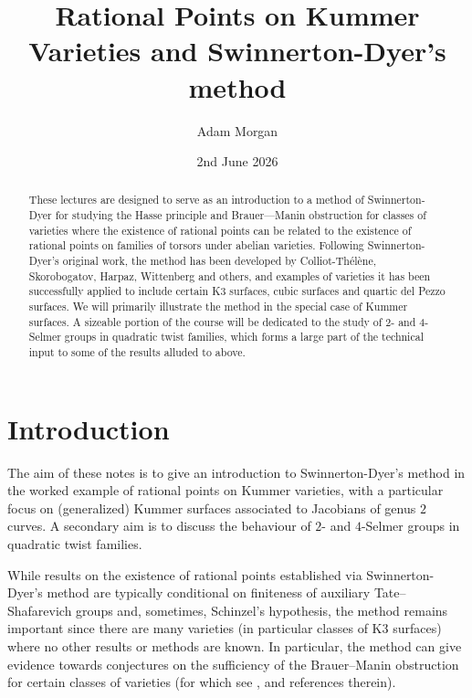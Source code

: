 \documentclass[10pt]{amsart}
\numberwithin{equation}{section}
\theoremstyle{remark}
\theoremstyle{definition}
\theoremstyle{definition}
\theoremstyle{definition}
\theoremstyle{definition}
\theoremstyle{definition}
\theoremstyle{definition}
\theoremstyle{definition}
\theoremstyle{definition}
\begin{document}
 

\title{Rational Points on Kummer Varieties and Swinnerton-Dyer's method}
\date{2nd June 2026}
\author{Adam Morgan}
\setcounter{tocdepth}{1}
\maketitle



\begin{abstract}
These lectures are designed to serve as an introduction to a method of Swinnerton-Dyer for  studying the Hasse principle and Brauer—Manin obstruction for classes of varieties where the existence of rational points can be related to the existence of rational points on families of torsors under abelian varieties. Following Swinnerton-Dyer’s original work, the method has been developed by Colliot-Thélène, Skorobogatov, Harpaz, Wittenberg and others, and examples of varieties it has been successfully applied to include certain K3 surfaces, cubic surfaces and quartic del Pezzo surfaces.  
We will primarily illustrate the method in the special case of Kummer surfaces. A sizeable portion of the course will be dedicated to the study of 2- and 4-Selmer groups in quadratic twist families, which forms a large part of the technical input to some of the results alluded to above.
\end{abstract}

\tableofcontents
\vspace{-10pt}

\section{Introduction}

The aim of these notes is to give an introduction to Swinnerton-Dyer's method in the worked example of rational points on Kummer varieties, with a particular focus on (generalized) Kummer surfaces associated to Jacobians of genus $2$ curves. A secondary aim is to discuss the behaviour of $2$- and $4$-Selmer groups in quadratic twist families. 

While results on the existence of rational points established via Swinnerton-Dyer's method are typically conditional on finiteness of auxiliary Tate--Shafarevich groups and, sometimes, Schinzel's hypothesis, the method remains important since there are many   varieties (in particular classes of K3 surfaces) where no other results or methods are known. In particular, the method can give evidence towards conjectures on the sufficiency of the Brauer--Manin obstruction for certain classes of varieties (for which see \cite{CT2003}, \cite[p. 77]{Skoro2009} and references therein). 
\end{document}
